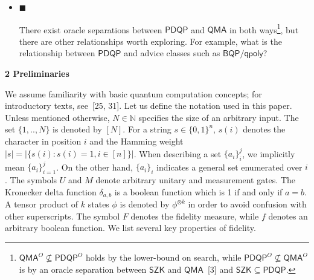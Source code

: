 \documentclass[10pt,a4paper]{article}
\begin{document}
\begin{itemize}
\item[] 
$\blacksquare$ 


There exist oracle separations between $\mathsf{PDQP}$ and $\mathsf{QMA}$ in both ways\footnote{$\mathsf{QMA}^{O}\not\subseteq\mathsf{PDQP}^{O}$ holds by the lower-bound on search, while $\mathsf{PDQP}^{O}\not\subseteq\mathsf{QMA}^{O}$ is by an oracle separation between $\mathsf{SZK}$ and $\mathsf{QMA}$ [3] and $\mathsf{SZK}\subseteq\mathsf{PDQP}$.}, but there are other relationships worth exploring. For example, what is the relationship between $\mathsf{PDQP}$ and advice classes such as $\mathsf{BQP/qpoly}$?\par





\end{itemize}






\par\medskip\noindent\textbf{
2 Preliminaries}\par




We assume familiarity with basic quantum computation concepts; for introductory texts, see [25, 31].
Let us define the notation used in this paper. Unless mentioned otherwise, $N\in\mathbb{N}$ specifies the size of an arbitrary input. The set $\{1,..,N\}$ is denoted by $[N]$. For a string $s\in\{0,1\}^{n}$, $s(i)$ denotes the character in position $i$ and the Hamming weight $|s|=|\{s(i):s(i)=1,i\in[n]\}|$. When describing a set $\{a_{i}\}_{i}^{j}$, we implicitly mean $\{a_{i}\}_{i=1}^{j}$. On the other hand, $\{a_{i}\}_{i}$ indicates a general set enumerated over $i$. The symbols $U$ and $M$ denote arbitrary unitary and measurement gates. The Kronecker delta function $\delta_{a,b}$ is a boolean function which is 1 if and only if $a=b$.
A tensor product of $k$ states $\phi$ is denoted by $\phi^{\otimes k}$ in order to avoid confusion with other superscripts.
The symbol $F$ denotes the fidelity measure, while $f$ denotes an arbitrary boolean function. We list several key properties of fidelity.\par
\end{document}
